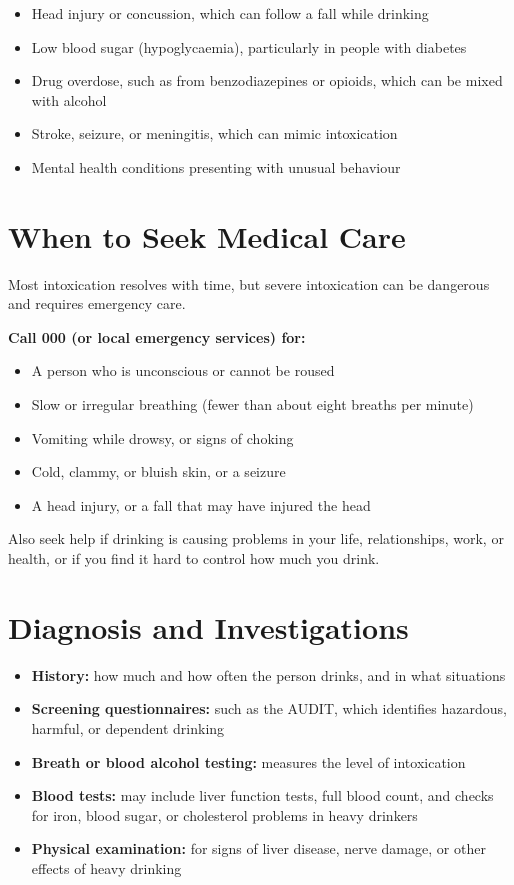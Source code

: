 \begin{itemize}
    \item Head injury or concussion, which can follow a fall while drinking
    \item Low blood sugar (hypoglycaemia), particularly in people with diabetes
    \item Drug overdose, such as from benzodiazepines or opioids, which can be mixed with alcohol
    \item Stroke, seizure, or meningitis, which can mimic intoxication
    \item Mental health conditions presenting with unusual behaviour
\end{itemize}

\section*{When to Seek Medical Care}
Most intoxication resolves with time, but severe intoxication can be dangerous and requires emergency care.

\textbf{Call 000 (or local emergency services) for:}
\begin{itemize}
    \item A person who is unconscious or cannot be roused
    \item Slow or irregular breathing (fewer than about eight breaths per minute)
    \item Vomiting while drowsy, or signs of choking
    \item Cold, clammy, or bluish skin, or a seizure
    \item A head injury, or a fall that may have injured the head
\end{itemize}

Also seek help if drinking is causing problems in your life, relationships, work, or health, or if you find it hard to control how much you drink.

\section*{Diagnosis and Investigations}
\begin{itemize}
    \item \textbf{History:} how much and how often the person drinks, and in what situations
    \item \textbf{Screening questionnaires:} such as the AUDIT, which identifies hazardous, harmful, or dependent drinking
    \item \textbf{Breath or blood alcohol testing:} measures the level of intoxication
    \item \textbf{Blood tests:} may include liver function tests, full blood count, and checks for iron, blood sugar, or cholesterol problems in heavy drinkers
    \item \textbf{Physical examination:} for signs of liver disease, nerve damage, or other effects of heavy drinking
\end{itemize}

